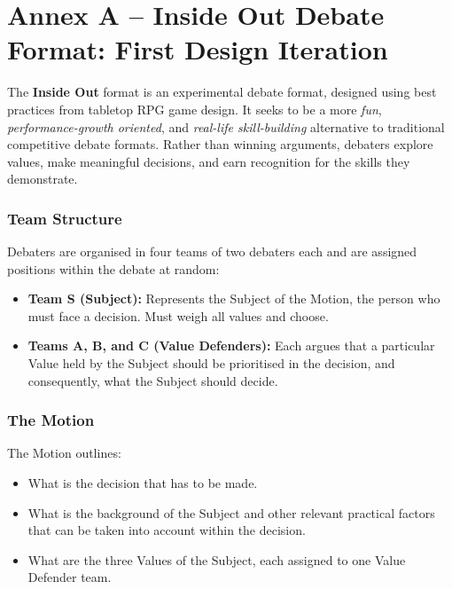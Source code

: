 
\newpage
\section*{Annex A -- Inside Out Debate Format: First Design Iteration}

The \textbf{Inside Out} format is an experimental debate format, designed using best practices from tabletop RPG game design. It seeks to be a more \textit{fun}, \textit{performance-growth oriented}, and \textit{real-life skill-building} alternative to traditional competitive debate formats. Rather than winning arguments, debaters explore values, make meaningful decisions, and earn recognition for the skills they demonstrate.

\subsubsection{Team Structure}

Debaters are organised in four teams of two debaters each and are assigned positions within the debate at random:

\begin{itemize}
    \item \textbf{Team S (Subject):} Represents the Subject of the Motion, the person who must face a decision. Must weigh all values and choose.
    \item \textbf{Teams A, B, and C (Value Defenders):} Each argues that a particular Value held by the Subject should be prioritised in the decision, and consequently, what the Subject should decide.
\end{itemize}

\subsubsection{The Motion}

The Motion outlines:

\begin{itemize}
    \item What is the decision that has to be made.
    \item What is the background of the Subject and other relevant practical factors that can be taken into account within the decision.
    \item What are the three Values of the Subject, each assigned to one Value Defender team.
\end{itemize}

